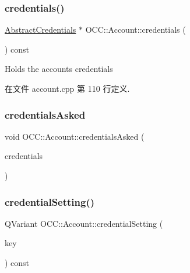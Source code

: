 \subsubsection{\texorpdfstring{credentials()}{credentials()}}
{\footnotesize\ttfamily \hyperlink{class_o_c_c_1_1_abstract_credentials}{Abstract\+Credentials} $\ast$ O\+C\+C\+::\+Account\+::credentials (\begin{DoxyParamCaption}{ }\end{DoxyParamCaption}) const}

Holds the accounts credentials 

在文件 account.\+cpp 第 110 行定义.

\mbox{\label{class_o_c_c_1_1_account_ad0f9b3ecec3d0ebd63f68b114b48182c}} 
\subsubsection{\texorpdfstring{credentials\+Asked}{credentialsAsked}}
{\footnotesize\ttfamily void O\+C\+C\+::\+Account\+::credentials\+Asked (\begin{DoxyParamCaption}\item[{\hyperlink{class_o_c_c_1_1_abstract_credentials}{Abstract\+Credentials} $\ast$}]{credentials }\end{DoxyParamCaption})\hspace{0.3cm}{\ttfamily [signal]}}

\mbox{\label{class_o_c_c_1_1_account_a229c4435821c7e548ca2f41d25830bb0}} 
\subsubsection{\texorpdfstring{credential\+Setting()}{credentialSetting()}}
{\footnotesize\ttfamily Q\+Variant O\+C\+C\+::\+Account\+::credential\+Setting (\begin{DoxyParamCaption}\item[{const Q\+String \&}]{key }\end{DoxyParamCaption}) const}



